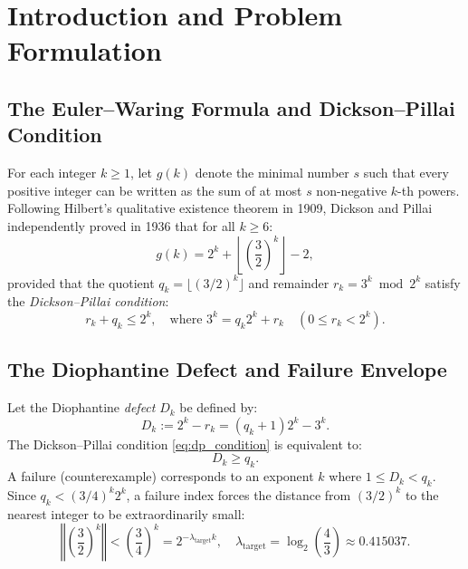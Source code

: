 \documentclass[11pt,reqno]{amsart}
\theoremstyle{definition}
\numberwithin{equation}{section}
\begin{document}
\maketitle

\tableofcontents

\section{Introduction and Problem Formulation}

\subsection{The Euler--Waring Formula and Dickson--Pillai Condition}
For each integer $k \ge 1$, let $g(k)$ denote the minimal number $s$ such that every positive integer can be written as the sum of at most $s$ non-negative $k$-th powers. Following Hilbert's qualitative existence theorem in 1909, Dickson \cite{dickson1936} and Pillai \cite{pillai1936} independently proved in 1936 that for all $k \ge 6$:
\begin{equation}\label{eq:euler_waring}
g(k) = 2^k + \left\lfloor \left(\frac{3}{2}\right)^k \right\rfloor - 2,
\end{equation}
provided that the quotient $q_k = \lfloor (3/2)^k \rfloor$ and remainder $r_k = 3^k \bmod 2^k$ satisfy the \emph{Dickson--Pillai condition}:
\begin{equation}\label{eq:dp_condition}
r_k + q_k \le 2^k, \quad \text{where } 3^k = q_k 2^k + r_k \quad (0 \le r_k < 2^k).
\end{equation}

\subsection{The Diophantine Defect and Failure Envelope}
Let the Diophantine \emph{defect} $D_k$ be defined by:
\begin{equation}\label{eq:defect_def}
D_k := 2^k - r_k = (q_k + 1)2^k - 3^k.
\end{equation}
The Dickson--Pillai condition \eqref{eq:dp_condition} is equivalent to:
\begin{equation}\label{eq:defect_ineq}
D_k \ge q_k.
\end{equation}
A failure (counterexample) corresponds to an exponent $k$ where $1 \le D_k < q_k$.
Since $q_k < (3/4)^k 2^k$, a failure index forces the distance from $(3/2)^k$ to the nearest integer to be extraordinarily small:
\begin{equation}\label{eq:target_exponent}
\left\Vert \left(\frac{3}{2}\right)^k \right\Vert < \left(\frac{3}{4}\right)^k = 2^{-\lambda_{\mathrm{target}} k}, \quad \lambda_{\mathrm{target}} = \log_2\left(\frac{4}{3}\right) \approx 0.415037.
\end{equation}
\end{document}
